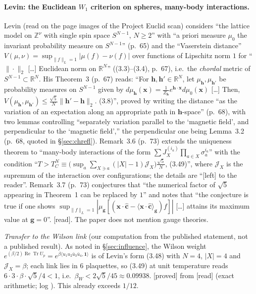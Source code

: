 \documentclass[11pt,a4paper]{article}
\theoremstyle{remark}
\theoremstyle{definition}
\newcommand{\R}{\mathbb{R}}
\newcommand{\Z}{\mathbb{Z}}
\newcommand{\ReTr}{\operatorname{Re}\operatorname{Tr}}
\newcommand{\st}[1]{\textsf{[#1]}}
\begin{document}
\paragraph{Levin: the Euclidean $W_1$ criterion on spheres, many-body interactions.} Levin \cite{Lev80}
(read on the page images of the Project Euclid scan) considers ``the lattice model on $\Z^\nu$ with single
spin space $S^{N-1}$, $N\geqslant2$'' with ``a priori measure $\mu_0$ the invariant probability measure on
$S^{N-1}$'' (p.~65) and the ``Vaserstein distance'' $V(\mu,\nu)=\sup_{\|f\|_L=1}|\mu(f)-\nu(f)|$ over
functions of Lipschitz norm $1$ for ``$\|\cdot\|_2$ [\ldots] Euclidean norm on $\R^N$'' ((3.3)--(3.4), p.~67),
i.e.\ the \emph{chordal} metric of $S^{N-1}\subset\R^N$. His Theorem~3 (p.~67) reads: ``For $\mathbf h,\mathbf h'\in\R^N$,
let $\mu_{\mathbf h},\mu_{\mathbf h'}$ be probability measures on $S^{N-1}$ given by
$d\mu_{\mathbf h}(\mathbf x)=\frac1{Z_{\mathbf h}}e^{\mathbf h\cdot\mathbf x}d\mu_0(\mathbf x)$ [\ldots] Then,
$V(\mu_{\mathbf h},\mu_{\mathbf h'})\leqslant\frac{\sqrt5}{N}\|\mathbf h'-\mathbf h\|_2$. (3.8)'', proved by writing the
distance ``as the variation of an expectation along an appropriate path in $\mathbf h$-space'' (p.~68), with two
lemmas controlling ``separately variation parallel to the `magnetic field', and perpendicular to the `magnetic
field','' the perpendicular one being Lemma~3.2 (p.~68, quoted in \S\ref{sec:chrefl}). Remark~3.6 (p.~73) extends
the uniqueness theorem to ``many-body interactions of the
form $\sum J_X^{(i_a)}\prod_{a\in X}\sigma_a^{i_a}$'' with the condition
``$T>T_C^N\equiv\big(\sup_{a}\sum_{X\ni a}(|X|-1)\mathscr J_X\big)\frac{\sqrt5}{N}$, (3.49)'', where $\mathscr J_X$ is the
supremum of the interaction over configurations; the details are ``[left] to the reader''. Remark~3.7 (p.~73)
conjectures that ``the numerical factor of $\sqrt5$ appearing in Theorem~1 can be replaced by $1$'' and notes that
``the conjecture is true if one shows $\sup_{\|f\|_L=1}|\mu_{\mathbf g}[(\mathbf x\cdot\hat{\mathbf c}-\langle\mathbf x\cdot\hat{\mathbf c}\rangle_{\mathbf g})f]|$ [\ldots]
attains its maximum value at $\mathbf g=0$''. \st{read}. The paper does not mention gauge theories.

\emph{Transfer to the Wilson link} (our computation from the published statement, not a published
result). As noted in \S\ref{sec:influence}, the Wilson weight $e^{(\beta/2)\ReTr U_p}=e^{\beta\langle u_1u_2\bar u_3\bar u_4,\mathbf 1\rangle}$
is of Levin's form (3.48) with $N=4$, $|X|=4$ and $\mathscr J_X=\beta$; each link lies in $6$ plaquettes, so (3.49)
at unit temperature reads $6\cdot3\cdot\beta\cdot\sqrt5/4<1$, i.e.\ $\beta_W<2\sqrt5/45\approx0.09938$.
\st{proved} from \st{read} (exact arithmetic; log ).
This already exceeds $1/12$.
\end{document}
